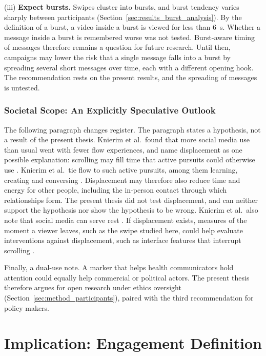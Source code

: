 \documentclass[12pt,a4paper]{report}
\begin{document}
(iii) \textbf{Expect bursts.} Swipes cluster into bursts, and burst tendency varies sharply between participants (Section~\ref{sec:results_burst_analysis}). By the definition of a burst, a video inside a burst is viewed for less than 6~s. Whether a message inside a burst is remembered worse was not tested. Burst-aware timing of messages therefore remains a question for future research. Until then, campaigns may lower the risk that a single message falls into a burst by spreading several short messages over time, each with a different opening hook. The recommendation rests on the present results, and the spreading of messages is untested.

\subsubsection{Societal Scope: An Explicitly Speculative Outlook}

The following paragraph changes register. The paragraph states a hypothesis, not a result of the present thesis. Knierim et al.\ found that more social media use than usual went with fewer flow experiences, and name displacement as one possible explanation: scrolling may fill time that active pursuits could otherwise use \cite{knierim_flow_2026}. Knierim et al.\ tie flow to such active pursuits, among them learning, creating and conversing \cite{knierim_flow_2026}. Displacement may therefore also reduce time and energy for other people, including the in-person contact through which relationships form. The present thesis did not test displacement, and can neither support the hypothesis nor show the hypothesis to be wrong. Knierim et al.\ also note that social media can serve rest \cite{knierim_flow_2026}. If displacement exists, measures of the moment a viewer leaves, such as the swipe studied here, could help evaluate interventions against displacement, such as interface features that interrupt scrolling \cite{baughan_i_2022}.

Finally, a dual-use note. A marker that helps health communicators hold attention could equally help commercial or political actors. The present thesis therefore argues for open research under ethics oversight (Section~\ref{sec:method_participants}), paired with the third recommendation for policy makers.

\section{Implication: Engagement Definition}
\label{sec:engagement_updated}
\end{document}
